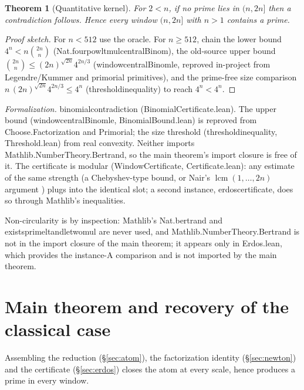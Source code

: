 \documentclass[11pt,a4paper]{amsart}
\theoremstyle{plain}
\newtheorem{theorem}{Theorem}[section]
\theoremstyle{definition}
\theoremstyle{plain}
\theoremstyle{remark}
\newcommand{\lean}[1]{\begingroup\upshape\ttfamily\def\_{\textunderscore\allowbreak}#1\endgroup}
\newcommand{\Formal}[1]{\par\smallskip\noindent\begingroup\raggedright\emph{Formalization.} #1\par\endgroup\smallskip}
\begin{document}
\begin{theorem}[Quantitative kernel]\label{thm:erdos}
For $2<n$, if no prime lies in $(n,2n]$ then a contradiction follows. Hence every window
$(n,2n]$ with $n>1$ contains a prime.
\end{theorem}

\begin{proof}[Proof sketch]
For $n<512$ use the oracle. For $n\ge512$, chain the lower bound
$4^n<n\binom{2n}{n}$ (\lean{Nat.four\_pow\_lt\_mul\_centralBinom}), the old-source upper
bound $\binom{2n}{n}\le(2n)^{\sqrt{2n}}4^{2n/3}$ (\lean{window\_centralBinom\_le}, reproved
in-project from Legendre/Kummer and primorial primitives), and the prime-free size
comparison $n\,(2n)^{\sqrt{2n}}4^{2n/3}\le4^n$ (\lean{threshold\_inequality}) to reach
$4^n<4^n$.
\end{proof}

\Formal{\lean{binomial\_contradiction} (\lean{BinomialCertificate.lean}). The upper bound
(\lean{window\_centralBinom\_le}, \lean{BinomialBound.lean}) is reproved from
\lean{Choose.Factorization} and \lean{Primorial}; the size threshold
(\lean{threshold\_inequality}, \lean{Threshold.lean}) from real convexity. Neither imports
\lean{Mathlib.NumberTheory.Bertrand}, so the main theorem's import closure is free of it.
The certificate is modular (\lean{WindowCertificate}, \lean{Certificate.lean}): any estimate
of the same strength (a Chebyshev-type bound, or Nair's $\operatorname{lcm}(1,\dots,2n)$
argument \cite{nair1982}) plugs into the identical slot; a second instance,
\lean{erdos\_certificate}, does so through Mathlib's inequalities.}

Non-circularity is by inspection: Mathlib's \lean{Nat.bertrand} and
\lean{exists\_prime\_lt\_and\_le\_two\_mul} are never used, and
\lean{Mathlib.NumberTheory.Bertrand} is not in the import closure of the main theorem; it
appears only in \lean{Erdos.lean}, which provides the instance-A comparison and is not
imported by the main theorem.

\section{Main theorem and recovery of the classical case}
\label{sec:main}

Assembling the reduction (\S\ref{sec:atom}), the factorization identity (\S\ref{sec:newton})
and the certificate (\S\ref{sec:erdos}) closes the atom at every scale, hence produces a prime
in every window.
\end{document}
